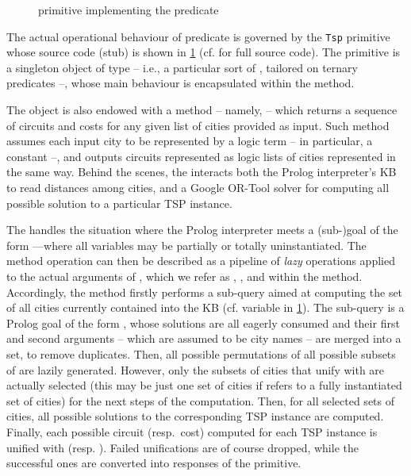 \documentclass[12pt,a4paper,openright,twoside]{book}
\begin{document}
\begin{figure}
    
    \caption{\twopkt{} primitive implementing the  predicate}
    \label{lst:2pkt:tsp}
\end{figure}

The actual operational behaviour of predicate  is governed by the \texttt{Tsp} primitive whose source code (stub) is shown in \cref{lst:2pkt:tsp} (cf. \cite{2P-Kt-TSP-Example} for full source code).
%
The  primitive is a singleton object of type  -- i.e., a particular sort of , tailored on ternary predicates --, whose main behaviour is encapsulated within the  method.

The  object is also endowed with a method -- namely,  -- which returns a sequence of circuits and costs for any given list of cities provided as input.
%
Such method assumes each input city to be represented by a logic term -- in particular, a constant --, and outputs circuits represented as logic lists of cities represented in the same way.
%
Behind the scenes, the  interacts both the Prolog interpreter's KB to read distances among cities, and a Google OR-Tool solver for computing all possible solution to a particular TSP instance.

The  handles the situation where the Prolog interpreter meets a (sub-)goal of the form ---where all variables may be partially or totally uninstantiated.
%
The method operation can then be described as a pipeline of \emph{lazy} operations applied to the actual arguments of , which we refer as , , and  within the method.
%
Accordingly, the method firstly performs a sub-query aimed at computing the set of all cities currently contained into the KB (cf. variable  in \cref{lst:2pkt:tsp}).
%
The sub-query is a Prolog goal of the form , whose solutions are all eagerly consumed and their first and second arguments -- which are assumed to be city names -- are merged into a set, to remove duplicates.
%
Then, all possible permutations of all possible subsets of  are lazily generated.
%
However, only the subsets of cities that unify with  are actually selected (this may be just one set of cities if  refers to a fully instantiated set of cities) for the next steps of the computation.
%
Then, for all selected sets of cities, all possible solutions to the corresponding TSP instance are computed.
%
Finally, each possible circuit (resp.\ cost) computed for each TSP instance is unified with  (resp. ).
%
Failed unifications are of course dropped, while the successful ones are converted into responses of the  primitive.
\end{document}
